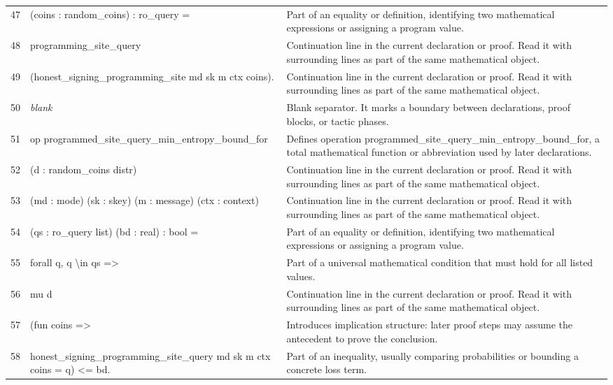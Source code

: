 \documentclass[10pt]{article}
\begin{document}
\begin{longtable}{r L{0.53\textwidth} L{0.37\textwidth}}
47 & {\ttfamily\scriptsize    (coins : random\_coins) : ro\_query =} & Part of an equality or definition, identifying two mathematical expressions or assigning a program value. \\
48 & {\ttfamily\scriptsize   programming\_site\_query} & Continuation line in the current declaration or proof.  Read it with surrounding lines as part of the same mathematical object. \\
49 & {\ttfamily\scriptsize     (honest\_signing\_programming\_site md sk m ctx coins).} & Continuation line in the current declaration or proof.  Read it with surrounding lines as part of the same mathematical object. \\
50 & {\ttfamily\scriptsize \emph{blank}} & Blank separator.  It marks a boundary between declarations, proof blocks, or tactic phases. \\
51 & {\ttfamily\scriptsize op programmed\_site\_query\_min\_entropy\_bound\_for} & Defines operation programmed\_site\_query\_min\_entropy\_bound\_for, a total mathematical function or abbreviation used by later declarations. \\
52 & {\ttfamily\scriptsize    (d : random\_coins distr)} & Continuation line in the current declaration or proof.  Read it with surrounding lines as part of the same mathematical object. \\
53 & {\ttfamily\scriptsize    (md : mode) (sk : skey) (m : message) (ctx : context)} & Continuation line in the current declaration or proof.  Read it with surrounding lines as part of the same mathematical object. \\
54 & {\ttfamily\scriptsize    (qs : ro\_query list) (bd : real) : bool =} & Part of an equality or definition, identifying two mathematical expressions or assigning a program value. \\
55 & {\ttfamily\scriptsize   forall q, q \textbackslash{}in qs =>} & Part of a universal mathematical condition that must hold for all listed values. \\
56 & {\ttfamily\scriptsize     mu d} & Continuation line in the current declaration or proof.  Read it with surrounding lines as part of the same mathematical object. \\
57 & {\ttfamily\scriptsize       (fun coins =>} & Introduces implication structure: later proof steps may assume the antecedent to prove the conclusion. \\
58 & {\ttfamily\scriptsize         honest\_signing\_programming\_site\_query md sk m ctx coins = q) <= bd.} & Part of an inequality, usually comparing probabilities or bounding a concrete loss term. \\

\end{longtable}
\end{document}

